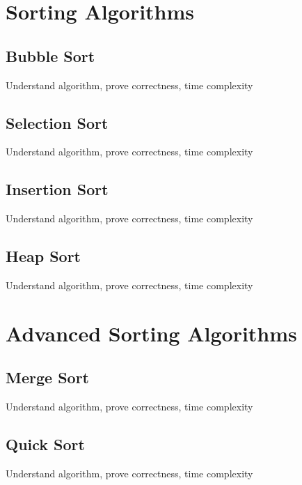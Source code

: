 \documentclass[10pt, 
a4paper, 
oneside, 
headinclude, footinclude, 
BCOR5mm]
{scrartcl}
\begin{document}
\newpage

\section{Sorting Algorithms}
\subsection{Bubble Sort}
Understand algorithm, prove correctness, time complexity 
\newpage
\subsection{Selection Sort}
Understand algorithm, prove correctness, time complexity 
\newpage
\subsection{Insertion Sort}
Understand algorithm, prove correctness, time complexity 
\newpage
\subsection{Heap Sort}
Understand algorithm, prove correctness, time complexity 
\newpage
\section{Advanced Sorting Algorithms}
\subsection{Merge Sort}
Understand algorithm, prove correctness, time complexity 
\newpage
\subsection{Quick Sort}
Understand algorithm, prove correctness, time complexity 
\newpage
\end{document}
